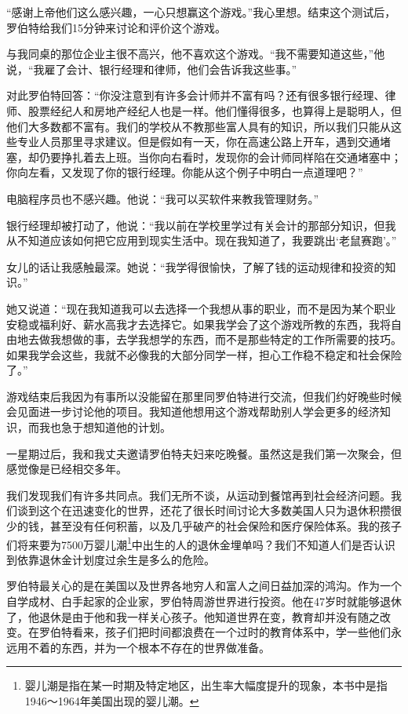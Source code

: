 “感谢上帝他们这么感兴趣，一心只想赢这个游戏。”我心里想。结束这个测试后，罗伯特给我们15分钟来讨论和评价这个游戏。

与我同桌的那位企业主很不高兴，他不喜欢这个游戏。“我不需要知道这些，”他说，“我雇了会计、银行经理和律师，他们会告诉我这些事。”

对此罗伯特回答：“你没注意到有许多会计师并不富有吗？还有很多银行经理、律师、股票经纪人和房地产经纪人也是一样。他们懂得很多，也算得上是聪明人，但他们大多数都不富有。我们的学校从不教那些富人具有的知识，所以我们只能从这些专业人员那里寻求建议。但是假如有一天，你在高速公路上开车，遇到交通堵塞，却仍要挣扎着去上班。当你向右看时，发现你的会计师同样陷在交通堵塞中；你向左看，又发现了你的银行经理。你能从这个例子中明白一点道理吧？”

电脑程序员也不感兴趣。他说：“我可以买软件来教我管理财务。”

银行经理却被打动了，他说：“我以前在学校里学过有关会计的那部分知识，但我从不知道应该如何把它应用到现实生活中。现在我知道了，我要跳出‘老鼠赛跑’。”

女儿的话让我感触最深。她说：“我学得很愉快，了解了钱的运动规律和投资的知识。”

她又说道：“现在我知道我可以去选择一个我想从事的职业，而不是因为某个职业安稳或福利好、薪水高我才去选择它。如果我学会了这个游戏所教的东西，我将自由地去做我想做的事，去学我想学的东西，而不是那些特定的工作所需要的技巧。如果我学会这些，我就不必像我的大部分同学一样，担心工作稳不稳定和社会保险了。”

游戏结束后我因为有事所以没能留在那里同罗伯特进行交流，但我们约好晚些时候会见面进一步讨论他的项目。我知道他想用这个游戏帮助别人学会更多的经济知识，而我也急于想知道他的计划。

一星期过后，我和我丈夫邀请罗伯特夫妇来吃晚餐。虽然这是我们第一次聚会，但感觉像是已经相交多年。

我们发现我们有许多共同点。我们无所不谈，从运动到餐馆再到社会经济问题。我们谈到这个在迅速变化的世界，还花了很长时间讨论大多数美国人只为退休积攒很少的钱，甚至没有任何积蓄，以及几乎破产的社会保险和医疗保险体系。我的孩子们将来要为7500万婴儿潮\footnote{婴儿潮是指在某一时期及特定地区，出生率大幅度提升的现象，本书中是指1946～1964年美国出现的婴儿潮。}中出生的人的退休金埋单吗？我们不知道人们是否认识到依靠退休金计划度过余生是多么的危险。

罗伯特最关心的是在美国以及世界各地穷人和富人之间日益加深的鸿沟。作为一个自学成材、白手起家的企业家，罗伯特周游世界进行投资。他在47岁时就能够退休了，他退休是由于他和我一样关心孩子。他知道世界在变，教育却并没有随之改变。在罗伯特看来，孩子们把时间都浪费在一个过时的教育体系中，学一些他们永远用不着的东西，并为一个根本不存在的世界做准备。

